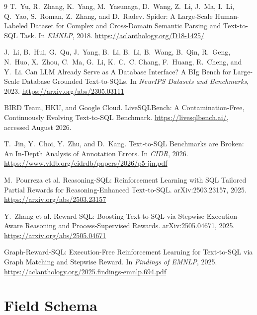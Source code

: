 \documentclass[11pt,letterpaper]{article}
\theoremstyle{definition}
\theoremstyle{plain}
\theoremstyle{remark}
\begin{document}
\begin{thebibliography}{9}
\small
{}
T.~Yu, R.~Zhang, K.~Yang, M.~Yasunaga, D.~Wang, Z.~Li, J.~Ma, I.~Li, Q.~Yao, S.~Roman,
Z.~Zhang, and D.~Radev.
\newblock Spider: A Large-Scale Human-Labeled Dataset for Complex and Cross-Domain Semantic
Parsing and Text-to-SQL Task.
\newblock In \emph{EMNLP}, 2018. \url{https://aclanthology.org/D18-1425/}

J.~Li, B.~Hui, G.~Qu, J.~Yang, B.~Li, B.~Li, B.~Wang, B.~Qin, R.~Geng, N.~Huo, X.~Zhou,
C.~Ma, G.~Li, K.~C.~C. Chang, F.~Huang, R.~Cheng, and Y.~Li.
\newblock Can LLM Already Serve as A Database Interface? A BIg Bench for Large-Scale Database
Grounded Text-to-SQLs.
\newblock In \emph{NeurIPS Datasets and Benchmarks}, 2023.
\newblock \url{https://arxiv.org/abs/2305.03111}

BIRD Team, HKU, and Google Cloud.
\newblock LiveSQLBench: A Contamination-Free, Continuously Evolving Text-to-SQL Benchmark.
\newblock \url{https://livesqlbench.ai/}, accessed August 2026.

T.~Jin, Y.~Choi, Y.~Zhu, and D.~Kang.
\newblock Text-to-SQL Benchmarks are Broken: An In-Depth Analysis of Annotation Errors.
\newblock In \emph{CIDR}, 2026.
\newblock \url{https://www.vldb.org/cidrdb/papers/2026/p5-jin.pdf}

M.~Pourreza et al.
\newblock Reasoning-SQL: Reinforcement Learning with SQL Tailored Partial Rewards for
Reasoning-Enhanced Text-to-SQL.
\newblock arXiv:2503.23157, 2025. \url{https://arxiv.org/abs/2503.23157}

Y.~Zhang et al.
\newblock Reward-SQL: Boosting Text-to-SQL via Stepwise Execution-Aware Reasoning and
Process-Supervised Rewards.
\newblock arXiv:2505.04671, 2025. \url{https://arxiv.org/abs/2505.04671}

Graph-Reward-SQL: Execution-Free Reinforcement Learning for Text-to-SQL via Graph Matching
and Stepwise Reward.
\newblock In \emph{Findings of EMNLP}, 2025.
\newblock \url{https://aclanthology.org/2025.findings-emnlp.694.pdf}
\end{thebibliography}

\appendix

\section{Field Schema}
\label{app:fields}
\end{document}
